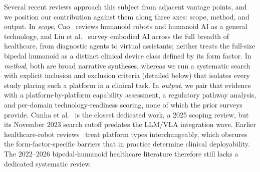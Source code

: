 Several recent reviews approach this subject from adjacent vantage points, and we
position our contribution against them along three axes: scope, method, and
output. In \emph{scope}, Cao~\cite{cao2025humanoid} reviews humanoid robots and
humanoid AI as a general technology, and Liu et al.~\cite{liu2025screens} survey
embodied AI across the full breadth of healthcare, from diagnostic agents to
virtual assistants; neither treats the full-size bipedal humanoid as a distinct
clinical device class defined by its form factor. In \emph{method}, both are
broad narrative syntheses, whereas we run a systematic search with explicit
inclusion and exclusion criteria (detailed below) that isolates every study
placing such a platform in a clinical task. In \emph{output}, we pair
that evidence with a platform-by-platform capability assessment, a regulatory
pathway analysis, and per-domain technology-readiness scoring, none of which the
prior surveys provide. Cunha et al.~\cite{cunha2025humanoid} is the closest
dedicated work, a 2025 scoping review, but its November 2023 search cutoff
predates the LLM/VLA integration wave. Earlier healthcare-robot
reviews~\cite{azeta2018review,mukherjee2022humanoid,ozturkcan2022humanoid,huang2023intelligent,morgan2022robots}
treat platform types interchangeably, which obscures the form-factor-specific
barriers that in practice determine clinical deployability. The 2022--2026
bipedal-humanoid healthcare literature therefore still lacks a dedicated
systematic review.

